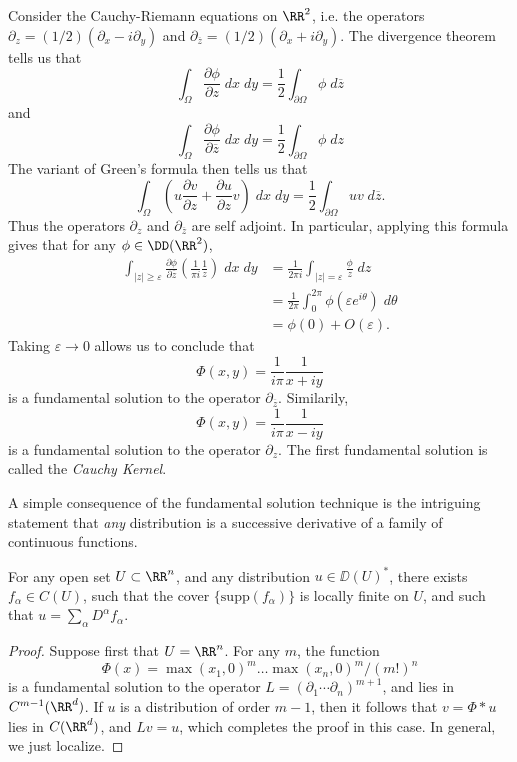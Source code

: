 \begin{example}
    Consider the Cauchy-Riemann equations on $\RR^2$, i.e. the operators $\partial_z = (1/2)(\partial_x - i \partial_y)$ and $\partial_{\overline{z}} = (1/2)(\partial_x + i \partial_y)$. The divergence theorem tells us that
    \[ \int_\Omega \frac{\partial \phi}{\partial z}\; dx\; dy = \frac{1}{2} \int_{\partial \Omega} \phi\; d\overline{z} \]
    and
    \[ \int_\Omega \frac{\partial \phi}{\partial \overline{z}}\; dx\; dy = \frac{1}{2} \int_{\partial \Omega} \phi\; dz \]
    The variant of Green's formula then tells us that
    \[ \int_\Omega \left( u \frac{\partial v}{\partial z} + \frac{\partial u}{\partial z} v \right)\; dx\; dy = \frac{1}{2} \int_{\partial \Omega} uv\; d\overline{z}. \]
    Thus the operators $\partial_z$ and $\partial_{\overline{z}}$ are self adjoint. In particular, applying this formula gives that for any $\phi \in \DD(\RR^2)$,
    \begin{align*}
        \int_{|z| \geq \varepsilon} \frac{\partial \phi}{\partial \overline{z}} \left( \frac{1}{\pi i} \frac{1}{z} \right)\; dx\; dy &= \frac{1}{2 \pi i} \int_{|z| = \varepsilon} \frac{\phi}{z}\; dz\\
        &= \frac{1}{2 \pi} \int_0^{2\pi} \phi(\varepsilon e^{i \theta})\; d\theta\\
        &= \phi(0) + O(\varepsilon).
    \end{align*}
    Taking $\varepsilon \to 0$ allows us to conclude that
    \[ \Phi(x,y) = \frac{1}{i \pi} \frac{1}{x + iy} \]
    is a fundamental solution to the operator $\partial_{\overline{z}}$. Similarily,
    \[ \Phi(x,y) = \frac{1}{i \pi} \frac{1}{x - iy} \]
    is a fundamental solution to the operator $\partial_z$. The first fundamental solution is called the \emph{Cauchy Kernel}.
\end{example}

A simple consequence of the fundamental solution technique is the intriguing statement that \emph{any} distribution is a successive derivative of a family of continuous functions.

\begin{theorem}
    For any open set $U \subset \RR^n$, and any distribution $u \in \DD(U)^*$, there exists $f_\alpha \in C(U)$, such that the cover $\{ \text{supp}(f_\alpha) \}$ is locally finite on $U$, and such that $u = \sum_\alpha D^\alpha f_\alpha$.
\end{theorem}
\begin{proof}
    Suppose first that $U = \RR^n$. For any $m$, the function
    \[ \Phi(x) = \max(x_1,0)^m \dots \max(x_n,0)^m / (m!)^n \]
    is a fundamental solution to the operator $L = (\partial_1 \cdots \partial_n)^{m+1}$, and lies in $C^{m-1}(\RR^d)$. If $u$ is a distribution of order $m-1$, then it follows that $v = \Phi * u$ lies in $C(\RR^d)$, and $Lv = u$, which completes the proof in this case. In general, we just localize.
\end{proof}

